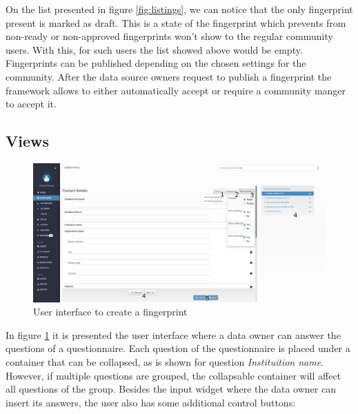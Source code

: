 On the list presented in figure \ref{fig:listings}, we can notice that the only fingerprint present is marked as draft.
This is a state of the fingerprint which prevents from non-ready or non-approved fingerprints won't show to the regular community users.
With this, for such users the list showed above would be empty.
Fingerprints can be published depending on the chosen settings for the community.
After the data source owners request to publish a fingerprint the framework allows to either automatically accept or require a community manger to accept it.

\subsection*{Views}

\begin{figure}[H]
    \center
    \includegraphics[width=\textwidth]{fingerprint-new}
    \caption{User interface to create a fingerprint}
    \label{fig:fingerprint-new}
\end{figure}

In figure \ref{fig:fingerprint-new} it is presented the user interface where a data owner can answer the questions of a questionnaire.
Each question of the questionnaire is placed under a container that can be collapsed, as is shown for question \textit{Instituition name}.
However, if multiple questions are grouped, the collapsable container will affect all questions of the group.
Besides the input widget where the data owner can insert its answers, the user also has some additional control buttons:

